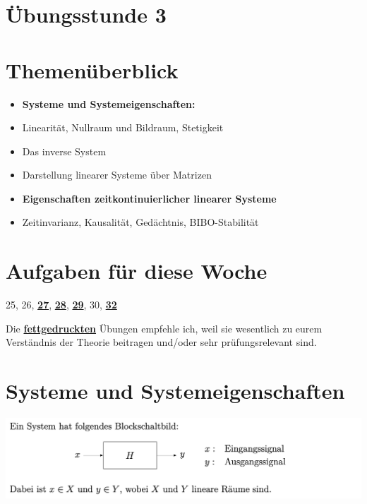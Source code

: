 \documentclass[11pt]{article}
\begin{document}
\thispagestyle{firstpage}

\setlength{\headheight}{1 \baselineskip}  %
\setlength{\parindent}{0pt}  %
\setlength{\parskip}{\baselineskip}  %

\vspace*{-5px}
\section*{Übungsstunde 3}

\section*{Themenüberblick}
\begin{itemize}
    \item \textbf{Systeme und Systemeigenschaften:}
    \item[] Linearität, Nullraum und Bildraum, Stetigkeit
    \item[] Das inverse System
    \item[] Darstellung linearer Systeme über Matrizen
    \item \textbf{Eigenschaften zeitkontinuierlicher linearer Systeme}
    \item[] Zeitinvarianz, Kausalität, Gedächtnis, BIBO-Stabilität
\end{itemize}

\section*{Aufgaben für diese Woche}
\vspace{-0.5cm}

25, 26, \underline{\textbf{27}}, \underline{\textbf{28}}, \underline{\textbf{29}}, 30, \underline{\textbf{32}}\\
\vspace{-0.5cm}

Die \underline{\textbf{fettgedruckten}} Übungen empfehle ich, weil sie wesentlich zu eurem Verständnis der Theorie beitragen und/oder sehr prüfungsrelevant sind.

\vfill \null
\pagebreak

\section*{Systeme und Systemeigenschaften}
\vspace*{-0.5cm}
\hspace{-0.3cm}
\includegraphics[width=0.95\linewidth]{docimgs/System_Blockschaltbild.png}
\end{document}
